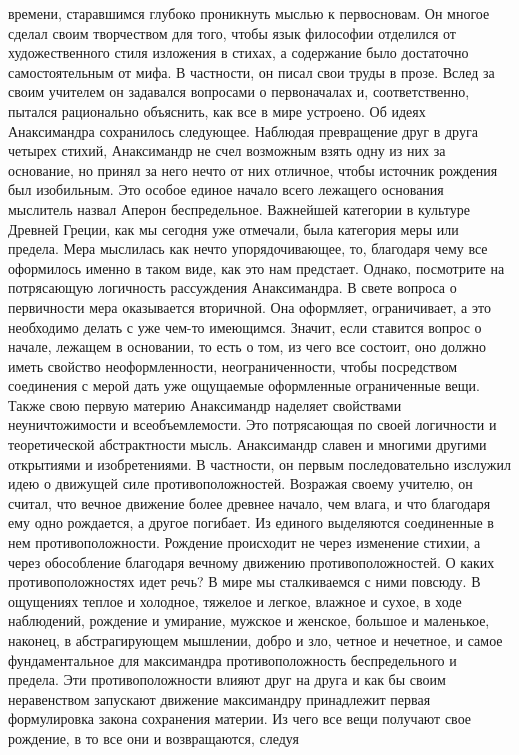 времени, старавшимся глубоко проникнуть мыслью к первосновам. Он многое сделал
своим творчеством для того, чтобы язык философии отделился от художественного
стиля изложения в стихах, а содержание было достаточно самостоятельным от мифа.
В частности, он писал свои труды в прозе. Вслед за своим учителем он задавался
вопросами о первоначалах и, соответственно, пытался рационально объяснить, как
все в мире устроено. Об идеях Анаксимандра сохранилось следующее. Наблюдая
превращение друг в друга четырех стихий, Анаксимандр не счел возможным взять
одну из них за основание, но принял за него нечто от них отличное, чтобы
источник рождения был изобильным. Это особое единое начало всего лежащего
основания мыслитель назвал Аперон беспредельное. Важнейшей категории в культуре
Древней Греции, как мы сегодня уже отмечали, была категория меры или предела.
Мера мыслилась как нечто упорядочивающее, то, благодаря чему все оформилось
именно в таком виде, как это нам предстает. Однако, посмотрите на потрясающую
логичность рассуждения Анаксимандра. В свете вопроса о первичности мера
оказывается вторичной. Она оформляет, ограничивает, а это необходимо делать с
уже чем-то имеющимся. Значит, если ставится вопрос о начале, лежащем в
основании, то есть о том, из чего все состоит, оно должно иметь свойство
неоформленности, неограниченности, чтобы посредством соединения с мерой дать уже
ощущаемые оформленные ограниченные вещи. Также свою первую материю Анаксимандр
наделяет свойствами неуничтожимости и всеобъемлемости. Это потрясающая по своей
логичности и теоретической абстрактности мысль. Анаксимандр славен и многими
другими открытиями и изобретениями. В частности, он первым последовательно
изслужил идею о движущей силе противоположностей. Возражая своему учителю, он
считал, что вечное движение более древнее начало, чем влага, и что благодаря ему
одно рождается, а другое погибает. Из единого выделяются соединенные в нем
противоположности. Рождение происходит не через изменение стихии, а через
обособление благодаря вечному движению противоположностей. О каких
противоположностях идет речь? В мире мы сталкиваемся с ними повсюду. В ощущениях
теплое и холодное, тяжелое и легкое, влажное и сухое, в ходе наблюдений,
рождение и умирание, мужское и женское, большое и маленькое, наконец, в
абстрагирующем мышлении, добро и зло, четное и нечетное, и самое фундаментальное
для максимандра противоположность беспредельного и предела. Эти
противоположности влияют друг на друга и как бы своим неравенством запускают
движение максимандру принадлежит первая формулировка закона сохранения материи.
Из чего все вещи получают свое рождение, в то все они и возвращаются, следуя
